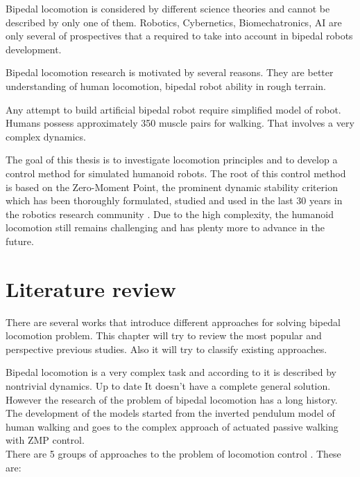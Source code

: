 \documentclass[12pt,a4paper]{report}
\begin{document}
		Bipedal locomotion is considered by different science theories and cannot be described by only one of them. Robotics, Cybernetics, Biomechatronics, AI are only several of prospectives that a required to take into account in bipedal robots development.
		
		Bipedal locomotion research is motivated by several reasons. They are better understanding of human locomotion, bipedal robot ability in rough terrain.
		
		Any attempt to build artificial bipedal robot require simplified model of robot. Humans possess approximately 350 muscle pairs for walking. That involves a very complex dynamics.
		
		
		The goal of this thesis is to investigate locomotion principles and to develop a control method for simulated humanoid robots. The root of this control method is based on the Zero-Moment Point, the prominent dynamic stability criterion which has been thoroughly formulated, studied and used in the last 30 years in the robotics research community \cite{controlbipedal}. Due to the high complexity, the humanoid locomotion still remains challenging and has plenty more to advance in the future.
	\chapter{Literature review}
		There are several works that introduce different approaches for solving bipedal locomotion problem. This chapter will try to review the most popular and perspective previous studies. Also it will try to classify existing approaches.
	
		Bipedal locomotion is a very complex task and according to \cite{erbatur2002study} it is described by nontrivial dynamics. Up to date It doesn't have a complete general solution. However the research of the problem of bipedal locomotion has a long history. The development of the models started from the inverted pendulum model of human walking and goes to the complex approach of actuated passive walking with ZMP control.\\
		There are 5 groups of approaches to the problem of locomotion control  \cite{wright2014intelligent}. These are:
		
\end{document}

